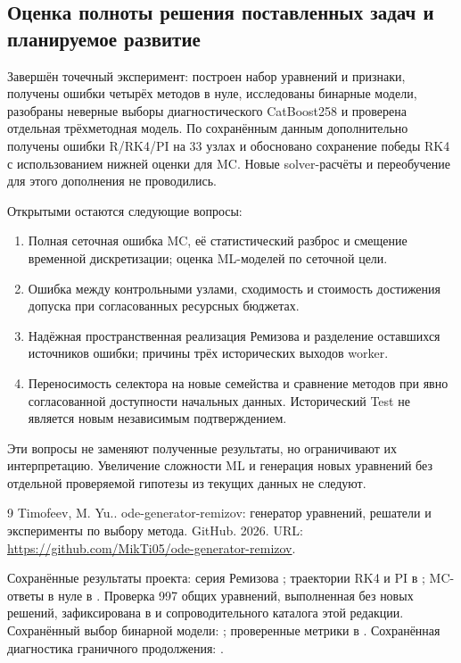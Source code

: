 \documentclass[14pt,a4paper]{extarticle}
\begin{document}
\subsection{Оценка полноты решения поставленных задач и планируемое развитие}
Завершён точечный эксперимент: построен набор уравнений и признаки,
получены ошибки четырёх методов в нуле, исследованы бинарные модели,
разобраны неверные выборы диагностического CatBoost258 и проверена
отдельная трёхметодная модель. По сохранённым данным дополнительно
получены ошибки R/RK4/PI на 33 узлах и обосновано сохранение победы
RK4 с использованием нижней оценки для MC. Новые solver-расчёты
и переобучение для этого дополнения не проводились.

Открытыми остаются следующие вопросы:
\begin{enumerate}
\item Полная сеточная ошибка MC, её статистический разброс и смещение
временной дискретизации; оценка ML-моделей по сеточной цели.
\item Ошибка между контрольными узлами, сходимость и стоимость
достижения допуска при согласованных ресурсных бюджетах.
\item Надёжная пространственная реализация Ремизова и разделение
оставшихся источников ошибки; причины трёх исторических выходов worker.
\item Переносимость селектора на новые семейства и сравнение методов
при явно согласованной доступности начальных данных. Исторический
Test не является новым независимым подтверждением.
\end{enumerate}
Эти вопросы не заменяют полученные результаты, но ограничивают
их интерпретацию. Увеличение сложности ML и генерация новых уравнений
без отдельной проверяемой гипотезы из текущих данных не следуют.

\clearpage
\renewcommand{\refname}{Список использованных источников}
{}
\begin{thebibliography}{9}
 Timofeev, M. Yu.. ode-generator-remizov: генератор уравнений, решатели и эксперименты по выбору метода. GitHub. 2026. URL: \url{https://github.com/MikTi05/ode-generator-remizov}.

 Сохранённые результаты проекта: серия Ремизова
;
траектории RK4 и PI в
;
MC-ответы в нуле в .
Проверка 997 общих уравнений, выполненная без новых решений,
зафиксирована в  и 
сопроводительного каталога этой редакции.
 Сохранённый выбор бинарной модели:
;
проверенные метрики в
.
 Сохранённая диагностика граничного продолжения:
.
\end{thebibliography}
\end{document}
